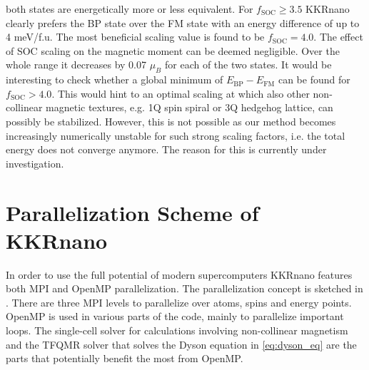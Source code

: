 \documentclass [a4paper, 12pt]{article}
\begin{document}
both states are energetically more or less equivalent.
For $f_{\text{SOC}} \geq 3.5$ KKRnano clearly prefers the BP state over the FM state with
an energy difference of up to 4 meV/f.u.
The most beneficial scaling value is found to be $f_{\text{SOC}}=4.0$.
The effect of SOC scaling on the magnetic moment can be deemed negligible. Over the whole
range it decreases by 0.07 $\mu_{B}$ for each of the two states.
It would be interesting to check whether a global minimum of $E_{\text{BP}}-E_{\text{FM}}$ can
be found for $f_{\text{SOC}} > 4.0$. This would hint to an optimal
scaling at which also other non-collinear magnetic textures, e.g. 1Q spin spiral or
3Q hedgehog lattice, can possibly be stabilized.
However, this is not possible as our method becomes increasingly numerically unstable for 
such strong scaling factors, i.e. the total energy does not converge anymore.
The reason for this is currently under investigation.


\section{Parallelization Scheme of KKRnano}
\label{sec:par_scheme}
In order to use the full potential of modern supercomputers
KKRnano features both MPI and OpenMP parallelization. The parallelization concept is sketched in
.
There are three MPI levels to parallelize over atoms,
spins and energy points. OpenMP is used in various parts of the code, mainly to parallelize important loops.
The single-cell solver for calculations involving non-collinear magnetism
and the
TFQMR solver that solves the Dyson equation in \cref{eq:dyson_eq} 
are the parts that potentially benefit the most from OpenMP.
\end{document}
